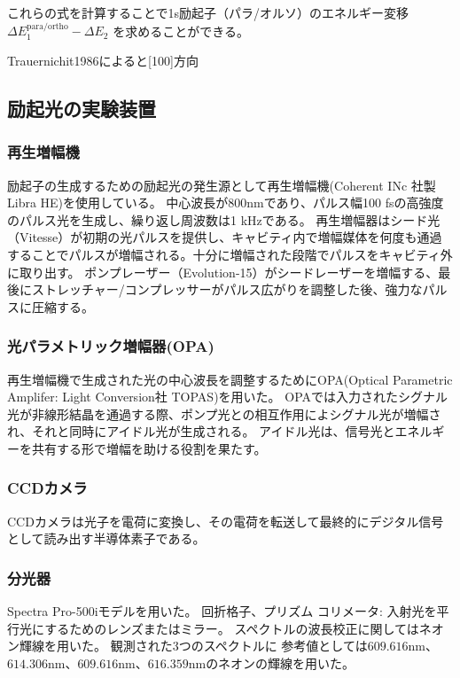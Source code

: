 これらの式を計算することで1s励起子（パラ/オルソ）のエネルギー変移 $\Delta E_1^{\text{para/ortho}} - \Delta E_2$ を求めることができる。

Trauernichit1986によると[100]方向



\subsection{励起光の実験装置}
\subsubsection*{再生増幅機}
励起子の生成するための励起光の発生源として再生増幅機(Coherent INc 社製 Libra HE)を使用している。
中心波長が800nmであり、パルス幅100 fsの高強度のパルス光を生成し、繰り返し周波数は1 kHzである。
再生増幅器はシード光（Vitesse）が初期の光パルスを提供し、キャビティ内で増幅媒体を何度も通過することでパルスが増幅される。十分に増幅された段階でパルスをキャビティ外に取り出す。
ポンプレーザー（Evolution-15）がシードレーザーを増幅する、最後にストレッチャー/コンプレッサーがパルス広がりを調整した後、強力なパルスに圧縮する。

\subsubsection*{光パラメトリック増幅器(OPA)}
再生増幅機で生成された光の中心波長を調整するためにOPA(Optical Parametric Amplifer: Light Conversion社 TOPAS)を用いた。
OPAでは入力されたシグナル光が非線形結晶を通過する際、ポンプ光との相互作用によシグナル光が増幅され、それと同時にアイドル光が生成される。
アイドル光は、信号光とエネルギーを共有する形で増幅を助ける役割を果たす。

\subsubsection*{CCDカメラ}
CCDカメラは光子を電荷に変換し、その電荷を転送して最終的にデジタル信号として読み出す半導体素子である。

\subsubsection*{分光器}
Spectra Pro-500iモデルを用いた。
回折格子、プリズム
コリメータ: 入射光を平行光にするためのレンズまたはミラー。
スペクトルの波長校正に関してはネオン輝線を用いた。
観測された3つのスペクトルに
参考値としては$609.616\mathrm{nm}$、$614.306\mathrm{nm}$、$609.616\mathrm{nm}$、$616.359\mathrm{nm}$のネオンの輝線を用いた。

